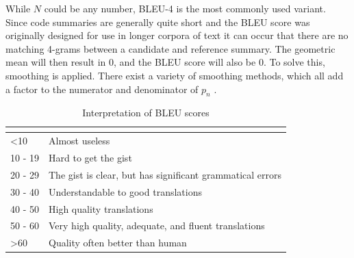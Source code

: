 While \(N\) could be any number, BLEU-4 is the most commonly used variant. Since code summaries are generally quite short and the BLEU score was originally designed for use in longer corpora of text it can occur that there are no matching 4-grams between a candidate and reference summary\cite{evaluationSummarization}. The geometric mean will then result in 0, and the BLEU score will also be 0. To solve this, smoothing is applied. There exist a variety of smoothing methods, which all add a factor to the numerator and denominator of \(p_n\) \cite{evaluationSummarization}.

\label{tab:BLEUScale}
\begin{table}[H]
\begin{tabular}{l|l}
\hline
\rowcolor[HTML]{E8EAED} 
\multicolumn{1}{|l|}{\cellcolor[HTML]{E8EAED}{\color[HTML]{202124} \textbf{BLEU Score}}} & \multicolumn{1}{l|}{\cellcolor[HTML]{E8EAED}{\color[HTML]{202124} Interpretation}} \\ \hline
\rowcolor[HTML]{FFFFFF} 
{\color[HTML]{202124} \textless 10}                                                      & {\color[HTML]{202124} Almost useless}                                              \\
\rowcolor[HTML]{FFFFFF} 
{\color[HTML]{202124} 10 - 19}                                                           & {\color[HTML]{202124} Hard to get the gist}                                        \\
\rowcolor[HTML]{FFFFFF} 
{\color[HTML]{202124} 20 - 29}                                                           & {\color[HTML]{202124} The gist is clear, but has significant grammatical errors}   \\
\rowcolor[HTML]{FFFFFF} 
{\color[HTML]{202124} 30 - 40}                                                           & {\color[HTML]{202124} Understandable to good translations}                         \\
\rowcolor[HTML]{FFFFFF} 
{\color[HTML]{202124} 40 - 50}                                                           & {\color[HTML]{202124} High quality translations}                                   \\
\rowcolor[HTML]{FFFFFF} 
{\color[HTML]{202124} 50 - 60}                                                           & {\color[HTML]{202124} Very high quality, adequate, and fluent translations}        \\
\rowcolor[HTML]{FFFFFF} 
{\color[HTML]{202124} \textgreater 60}                                                   & {\color[HTML]{202124} Quality often better than human}
\end{tabular}
\caption{Interpretation of BLEU scores \cite{evaluationSummarization}}
\end{table}

